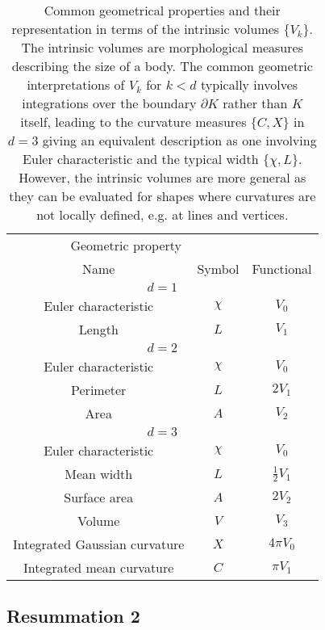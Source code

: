 \begin{SCtable}
  \begin{minipage}[b]{\linewidth}
    \centering
    \begin{tabular}{ccc}
      \toprule
      \multicolumn{2}{c}{Geometric property} \\
      \cmidrule(r){1-2}
      Name & Symbol & Functional \\
      \midrule
      \multicolumn{3}{c}{$d = 1$} \\
      \midrule
      Euler characteristic & $\chi$ & $V_0$ \\
      Length & $L$ & $V_1$ \\
      \midrule
      \multicolumn{3}{c}{$d = 2$} \\
      \midrule
      Euler characteristic & $\chi$ & $V_0$ \\
      Perimeter & $L$ & $2 V_1$ \\
      Area & $A$ & $V_2$ \\
      \midrule
      \multicolumn{3}{c}{$d = 3$} \\
      \midrule
      Euler characteristic & $\chi$ & $V_0$ \\
      Mean width & $L$ & $\frac{1}{2} V_1$ \\
      Surface area & $A$ & $2 V_2$ \\
      Volume & $V$ & $V_3$ \\
      Integrated Gaussian curvature & $X$ & $4 \pi V_0$ \\
      Integrated mean curvature & $C$ & $\pi V_1$ \\
      \bottomrule
    \end{tabular}
  \end{minipage}
  \caption{Common geometrical properties and their representation in terms of the intrinsic volumes $\{V_k\}$.
    The intrinsic volumes are morphological measures describing the size of a body.
    The common geometric interpretations of $V_k$ for $k < d$ typically involves integrations over the boundary $\partial K$ rather than $K$ itself, leading to the curvature measures $\{C,X\}$ in $d=3$ giving an equivalent description as one involving Euler characteristic and the typical width $\{\chi, L\}$.
    However, the intrinsic volumes are more general as they can be evaluated for shapes where curvatures are not locally defined, e.g. at lines and vertices.}
  \label{table:geometric-quantities}
\end{SCtable}

\subsection{Resummation 2}

